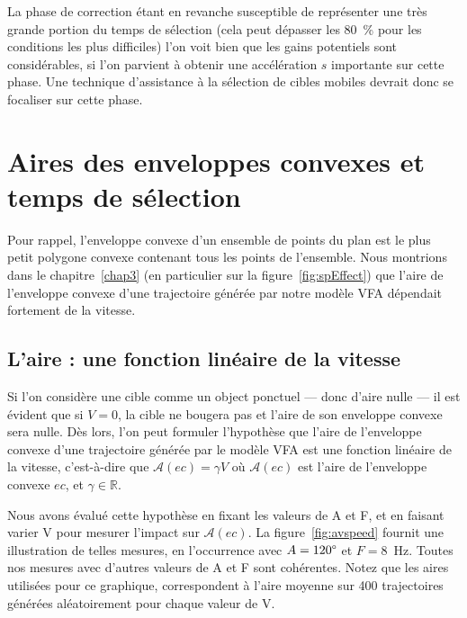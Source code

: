 	La phase de correction étant en revanche susceptible de représenter une très grande portion du temps de sélection (cela peut dépasser les 80~\%{} pour les conditions les plus difficiles) l'on voit bien que les gains potentiels sont considérables, si l'on parvient à obtenir une accélération $s$ importante sur cette phase. Une technique d'assistance à la sélection de cibles mobiles devrait donc se focaliser sur cette phase.
	
\section{Aires des enveloppes convexes et temps de sélection}
	Pour rappel, l'enveloppe convexe d'un ensemble de points du plan est le plus petit polygone convexe contenant tous les points de l'ensemble. Nous montrions dans le chapitre~\ref{chap3} (en particulier sur la figure~\ref{fig:spEffect}) que l'aire de l'enveloppe convexe d'une trajectoire générée par notre modèle VFA dépendait fortement de la vitesse.
	
	\subsection{L'aire : une fonction linéaire de la vitesse}
	Si l'on considère une cible comme un object ponctuel --- donc d'aire nulle --- il est évident que si $V = 0$, la cible ne bougera pas et l'aire de son enveloppe convexe sera nulle. Dès lors, l'on peut formuler l'hypothèse que l'aire de l'enveloppe convexe d'une trajectoire générée par le modèle VFA est une fonction linéaire de la vitesse, c'est-à-dire que $\mathcal{A}(ec) = \gamma{}V$ où $\mathcal{A}(ec)$ est l'aire de l'enveloppe convexe $ec$, et $\gamma \in \mathbb{R}$.
	
	Nous avons évalué cette hypothèse en fixant les valeurs de A et F, et en faisant varier V pour mesurer l'impact sur $\mathcal{A}(ec)$. La figure~\ref{fig:avspeed} fournit une illustration de telles mesures, en l'occurrence avec $A = 120\degree$ et $F = 8$~Hz. Toutes nos mesures avec d'autres valeurs de A et F sont cohérentes. Notez que les aires utilisées pour ce graphique, correspondent à l'aire moyenne sur 400 trajectoires générées aléatoirement pour chaque valeur de V.
	
